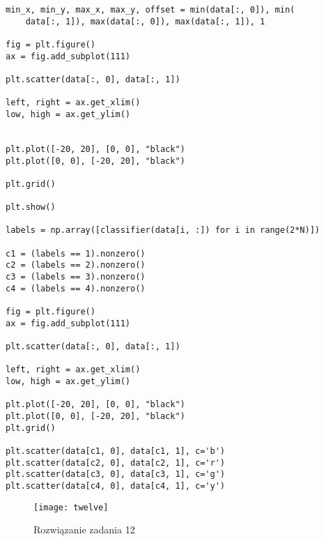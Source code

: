 \documentclass[12pt,a4paper]{article}
\begin{document}
\begin{itemize}
\begin{lstlisting}
min_x, min_y, max_x, max_y, offset = min(data[:, 0]), min(
    data[:, 1]), max(data[:, 0]), max(data[:, 1]), 1

fig = plt.figure()
ax = fig.add_subplot(111)

plt.scatter(data[:, 0], data[:, 1])

left, right = ax.get_xlim()
low, high = ax.get_ylim()


plt.plot([-20, 20], [0, 0], "black")
plt.plot([0, 0], [-20, 20], "black")

plt.grid()

plt.show()

labels = np.array([classifier(data[i, :]) for i in range(2*N)])

c1 = (labels == 1).nonzero()
c2 = (labels == 2).nonzero()
c3 = (labels == 3).nonzero()
c4 = (labels == 4).nonzero()

fig = plt.figure()
ax = fig.add_subplot(111)

plt.scatter(data[:, 0], data[:, 1])

left, right = ax.get_xlim()
low, high = ax.get_ylim()

plt.plot([-20, 20], [0, 0], "black")
plt.plot([0, 0], [-20, 20], "black")
plt.grid()

plt.scatter(data[c1, 0], data[c1, 1], c='b')
plt.scatter(data[c2, 0], data[c2, 1], c='r')
plt.scatter(data[c3, 0], data[c3, 1], c='g')
plt.scatter(data[c4, 0], data[c4, 1], c='y')

	\end{lstlisting}
		\begin{figure}[h]
                        \texttt{[image: twelve]}
                        \centering
			\caption{Rozwiązanie zadania 12}
			\label{fig:fig12}
                \end{figure}
                \clearpage

        	\end{itemize}
	
\end{document}
